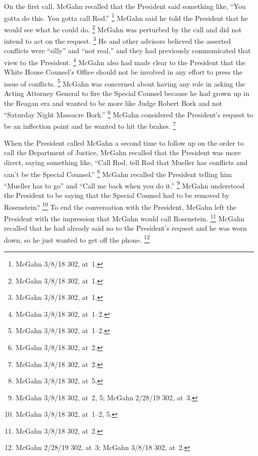 On the first call, McGahn recalled that the President said something like, ``You gotta do this.
You gotta call Rod.''%
\footnote{McGahn 3/8/18 302, at~1.}
McGahn said he told the President that he would see what he could do.%
\footnote{McGahn 3/8/18 302, at~1.}
McGahn was perturbed by the call and did not intend to act on the request.%
\footnote{McGahn 3/8/18 302, at~1.}
He and other advisors believed the asserted conflicts were ``silly'' and ``not real,'' and they had previously communicated that view to the President.%
\footnote{McGahn 3/8/18 302, at~1--2.}
McGahn also had made clear to the President that the White House Counsel's Office should not be involved in any effort to press the issue of conflicts.%
\footnote{McGahn 3/8/18 302, at~1--2.}
McGahn was concerned about having any role in asking the Acting Attorney General to fire the Special Counsel because he had grown up in the Reagan era and wanted to be more like Judge Robert Bork and not ``Saturday Night Massacre Bork.''%
\footnote{McGahn 3/8/18 302, at~2.}
McGahn considered the President's request to be an inflection point and he wanted to hit the brakes.%
\footnote{McGahn 3/8/18 302, at~2.}

When the President called McGahn a second time to follow up on the order to call the Department of Justice, McGahn recalled that the President was more direct, saying something like, ``Call Rod, tell Rod that Mueller has conflicts and can't be the Special Counsel.''%
\footnote{McGahn 3/8/18 302, at~5.}
McGahn recalled the President telling him ``Mueller has to go'' and ``Call me back when you do it.''%
\footnote{McGahn 3/8/18 302, at~2, 5;
McGahn 2/28/19 302, at~3.}
McGahn understood the President to be saying that the Special Counsel had to be removed by Rosenstein?%
\footnote{McGahn 3/8/18 302, at~1--2, 5.}
To end the conversation with the President, McGahn left the President with the impression that McGahn would call Rosenstein.%
\footnote{McGahn 3/8/18 302, at~2.}
McGahn recalled that he had already said no to the President's request and he was worn down, so he just wanted to get off the phone.%
\footnote{McGahn 2/28/19 302, at~3;
McGahn 3/8/18 302, at~2.}

